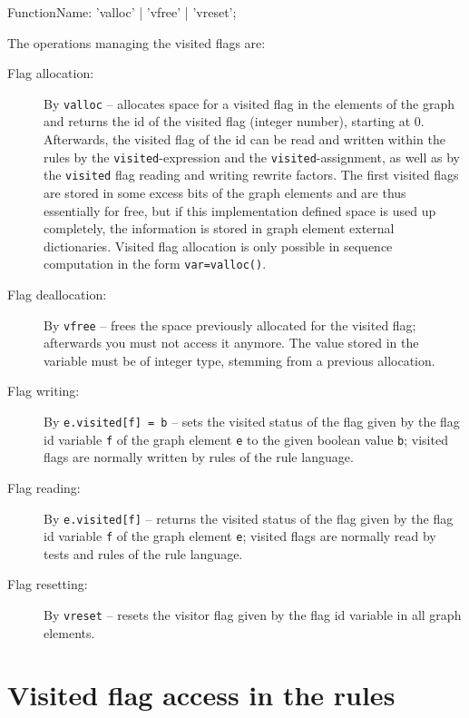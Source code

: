 \begin{rail}
  FunctionName: 'valloc' | 'vfree' | 'vreset';
\end{rail}

The operations managing the visited flags are:
\begin{description}
\item[Flag allocation:] By \texttt{valloc}\label{allocvisitflag} -- allocates space for a visited flag in the elements of the graph and returns the id of the visited flag (integer number), starting at 0.
Afterwards, the visited flag of the id can be read and written within the rules by the \texttt{visited}-expression and the \texttt{visited}-assignment,
as well as by the \texttt{visited} flag reading and writing rewrite factors.
The first visited flags are stored in some excess bits of the graph elements and are thus essentially for free,
but if this implementation defined space is used up completely, the information is stored in graph element external dictionaries.
Visited flag allocation is only possible in sequence computation in the form \texttt{var=valloc()}.
\item[Flag deallocation:] By \texttt{vfree} -- frees the space previously allocated for the visited flag; afterwards you must not access it anymore.
The value stored in the variable must be of integer type, stemming from a previous allocation.
\item[Flag writing:] By \texttt{e.visited[f] = b} -- sets the visited status of the flag given by the flag id variable \texttt{f} of the graph element \texttt{e} to the given boolean value \texttt{b}; visited flags are normally written by rules of the rule language.
\item[Flag reading:] By \texttt{e.visited[f]} -- returns the visited status of the flag given by the flag id variable \texttt{f} of the graph element \texttt{e}; visited flags are normally read by tests and rules of the rule language.
\item[Flag resetting:] By \texttt{vreset} -- resets the visitor flag given by the flag id variable in all graph elements.
\end{description}


\section{Visited flag access in the rules} \label{sub:visitedaccess}

